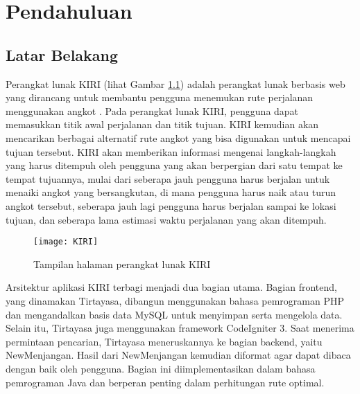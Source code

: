 \chapter{Pendahuluan}
\label{chap:intro}
   
\section{Latar Belakang}
\label{sec:label}

Perangkat lunak KIRI (lihat Gambar \ref{fig:kiri}) adalah perangkat lunak berbasis web yang dirancang untuk membantu pengguna menemukan rute perjalanan menggunakan angkot . Pada perangkat lunak KIRI, pengguna dapat memasukkan titik awal perjalanan dan titik tujuan. KIRI kemudian akan mencarikan berbagai alternatif rute angkot yang bisa digunakan untuk mencapai tujuan tersebut. KIRI akan memberikan informasi mengenai langkah-langkah yang harus ditempuh oleh pengguna yang akan berpergian dari satu tempat ke tempat tujuannya, mulai dari seberapa jauh pengguna harus berjalan untuk menaiki angkot yang bersangkutan, di mana pengguna harus naik atau turun angkot tersebut, seberapa jauh lagi pengguna harus berjalan sampai ke lokasi tujuan, dan seberapa lama estimasi waktu perjalanan yang akan ditempuh.
\begin{figure}[h] 
	\centering  
	\texttt{[image: KIRI]}  
	\caption{Tampilan halaman perangkat lunak KIRI}
	\label{fig:kiri} 
\end{figure}
\newpage
\noindent
Arsitektur aplikasi KIRI terbagi menjadi dua bagian utama. Bagian frontend, yang dinamakan Tirtayasa, dibangun menggunakan bahasa pemrograman PHP dan mengandalkan basis data MySQL untuk menyimpan serta mengelola data. Selain itu, Tirtayasa juga menggunakan framework CodeIgniter 3. Saat menerima permintaan pencarian, Tirtayasa meneruskannya ke bagian backend, yaitu NewMenjangan. Hasil dari NewMenjangan kemudian diformat agar dapat dibaca dengan baik oleh pengguna. Bagian ini diimplementasikan dalam bahasa pemrograman Java dan berperan penting dalam perhitungan rute optimal.
\\
